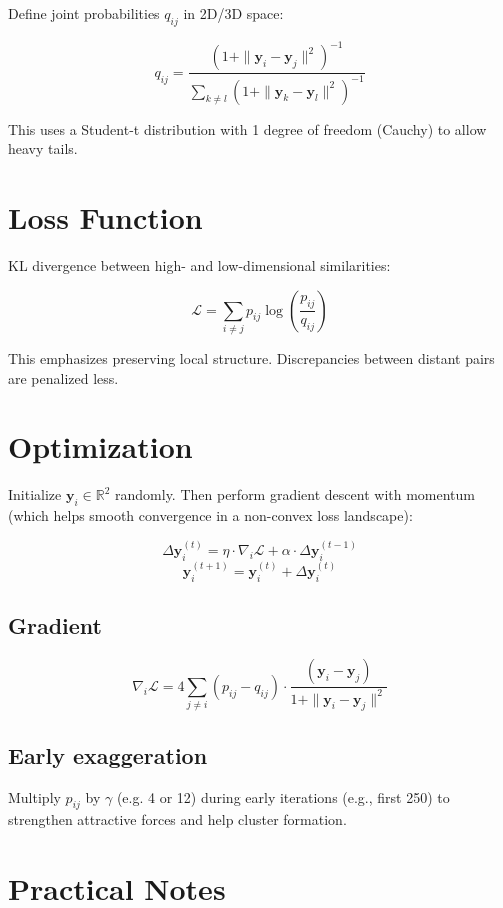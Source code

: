 \documentclass[11pt]{article}
\begin{document}
Define joint probabilities \( q_{ij} \) in 2D/3D space:

\[
  q_{ij} = \frac{\left(1 + \|\mathbf{y}_i - \mathbf{y}_j\|^2\right)^{-1}}{\sum_{k \ne l} \left(1 + \|\mathbf{y}_k - \mathbf{y}_l\|^2\right)^{-1}}
\]

This uses a Student-t distribution with 1 degree of freedom (Cauchy) to allow heavy tails.

\section{Loss Function}

KL divergence between high- and low-dimensional similarities:

\[
  \mathcal{L} = \sum_{i \ne j} p_{ij} \log \left(\frac{p_{ij}}{q_{ij}}\right)
\]

This emphasizes preserving local structure. Discrepancies between distant pairs are penalized less.

\section{Optimization}

Initialize \( \mathbf{y}_i \in \mathbb{R}^2 \) randomly. Then perform gradient descent with momentum (which helps smooth convergence in a non-convex loss landscape):

\[
  \Delta \mathbf{y}_i^{(t)} = \eta \cdot \nabla_i \mathcal{L} + \alpha \cdot \Delta \mathbf{y}_i^{(t-1)}
\]
\[
  \mathbf{y}_i^{(t+1)} = \mathbf{y}_i^{(t)} + \Delta \mathbf{y}_i^{(t)}
\]

\subsection*{Gradient}

\[
  \nabla_i \mathcal{L} = 4 \sum_{j \ne i} (p_{ij} - q_{ij}) \cdot \frac{(\mathbf{y}_i - \mathbf{y}_j)}{1 + \|\mathbf{y}_i - \mathbf{y}_j\|^2}
\]

\subsection*{Early exaggeration}

Multiply \( p_{ij} \) by \( \gamma \) (e.g. 4 or 12) during early iterations (e.g., first 250) to strengthen attractive
forces and help cluster formation.

\section{Practical Notes}
\end{document}
